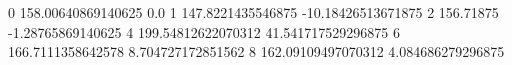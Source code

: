 0 158.00640869140625 0.0
1 147.8221435546875 -10.18426513671875
2 156.71875 -1.28765869140625
4 199.54812622070312 41.541717529296875
6 166.7111358642578 8.704727172851562
8 162.09109497070312 4.084686279296875
